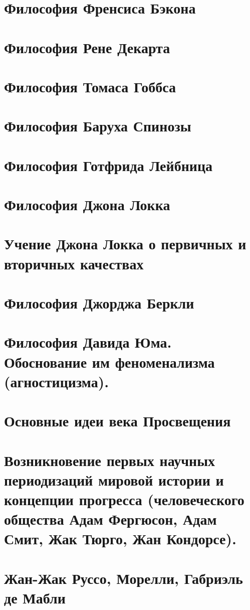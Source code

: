 \section{Философия Френсиса Бэкона}

\section{Философия Рене Декарта}
\section{Философия Томаса Гоббса}
\section{Философия Баруха Спинозы}
\section{Философия Готфрида Лейбница}
\section{Философия Джона Локка}
\section{Учение Джона Локка о первичных и вторичных качествах}
\section{Философия Джорджа Беркли}
\section{Философия Давида Юма. Обоснование им феноменализма (агностицизма).}
\section{Основные идеи века Просвещения}
\section{Возникновение первых научных периодизаций мировой истории и концепции прогресса (человеческого общества Адам Фергюсон, Адам Смит, Жак Тюрго, Жан Кондорсе).}
\section{Жан-Жак Руссо, Морелли, Габриэль де Мабли}
